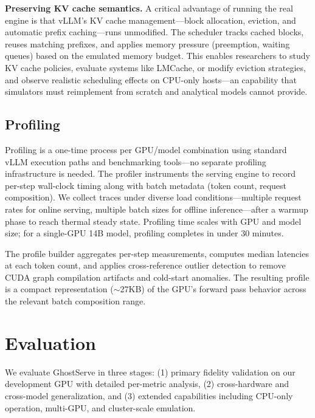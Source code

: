 \documentclass[conference]{IEEEtran}
\newcommand{\sysname}{GhostServe}
\begin{document}
\textbf{Preserving KV cache semantics.} A critical advantage of running the real engine is that vLLM's KV cache management---block allocation, eviction, and automatic prefix caching---runs unmodified. The scheduler tracks cached blocks, reuses matching prefixes, and applies memory pressure (preemption, waiting queues) based on the emulated memory budget. This enables researchers to study KV cache policies, evaluate systems like LMCache, or modify eviction strategies, and observe realistic scheduling effects on CPU-only hosts---an capability that simulators must reimplement from scratch and analytical models cannot provide.

\subsection{Profiling}
\label{sec:profiling}

Profiling is a one-time process per GPU/model combination using standard vLLM execution paths and benchmarking tools---no separate profiling infrastructure is needed. The profiler instruments the serving engine to record per-step wall-clock timing along with batch metadata (token count, request composition). We collect traces under diverse load conditions---multiple request rates for online serving, multiple batch sizes for offline inference---after a warmup phase to reach thermal steady state. Profiling time scales with GPU and model size; for a single-GPU 14B model, profiling completes in under 30 minutes.

The profile builder aggregates per-step measurements, computes median latencies at each token count, and applies cross-reference outlier detection to remove CUDA graph compilation artifacts and cold-start anomalies. The resulting profile is a compact representation ($\sim$27KB) of the GPU's forward pass behavior across the relevant batch composition range.

\section{Evaluation}

We evaluate \sysname{} in three stages: (1) primary fidelity validation on our development GPU with detailed per-metric analysis, (2) cross-hardware and cross-model generalization, and (3) extended capabilities including CPU-only operation, multi-GPU, and cluster-scale emulation.
\end{document}
